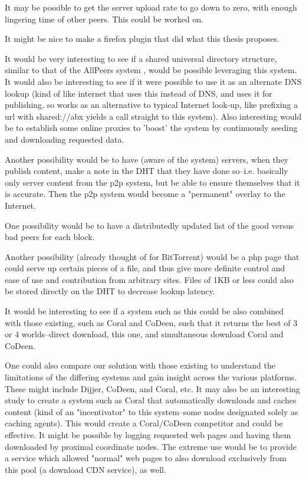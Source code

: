 It may be possible to get the server upload rate to go down to zero, with enough lingering time of other peers.  This could be worked on.

It might be nice to make a firefox plugin that did what this thesis proposes.

It would be very interesting to see if a shared universal directory structure, similar to that of the AllPeers system \cite{allpeers}, would be possible leveraging this system.  It would also be interesting to see if it were possible to use it as an alternate DNS lookup (kind of like internet that uses this instead of DNS, and uses it for publishing, so works as an alternative to typical Internet look-up, like prefixing a url with shared://abx yields a call straight to this system).  Also interesting would be to establish some online proxies to 'boost' the system by continuously seeding and downloading requested data.

Another possibility would be to have (aware of the system) servers, when they publish content, make a note in the DHT that they have done so--i.e. basically only server content from the p2p system, but be able to ensure themselves that it is accurate.  Then the p2p system would become a "permanent" overlay to the Internet.

One possibility would be to have a distributedly updated list of the good versus bad peers for each block.

Another possibility (already thought of for BitTorrent) would be a php page that could serve up certain pieces of a file, and thus give more definite control and ease of use and contribution from arbitrary sites. 
Files of 1KB or less could also be stored directly on the DHT to decrease lookup latency.

It would be interesting to see if a system such as this could be also combined with those existing, such as Coral and CoDeen, such that it returns the best of 3 or 4 worlds--direct download, this one, and simultaneous download Coral and CoDeen.

One could also compare our solution with those existing to understand the limitations of the differing systems and gain insight across the various platforms.  These might include Dijjer, CoDeen, and Coral, etc.  It may also be an interesting study to create a system such as Coral that automatically downloads and caches content (kind of an "incentivator" to this system--some nodes designated solely as caching agents).  This would create a Coral/CoDeen competitor and could be effective.  It might be possible by logging requested web pages and having them downloaded by proximal coordinate nodes.  The extreme use would be to provide a service which allowed "normal" web pages to also download exclusively from this pool (a download CDN service), as well.

